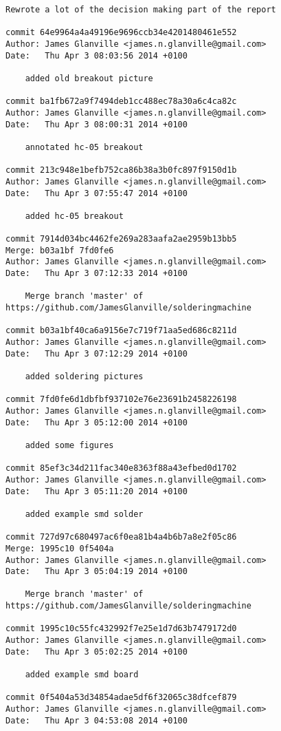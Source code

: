 \documentclass[a4paper,11pt]{article}  %
\begin{document}
\begin{lstlisting}[frame=single]
    Rewrote a lot of the decision making part of the report

commit 64e9964a4a49196e9696ccb34e4201480461e552
Author: James Glanville <james.n.glanville@gmail.com>
Date:   Thu Apr 3 08:03:56 2014 +0100

    added old breakout picture

commit ba1fb672a9f7494deb1cc488ec78a30a6c4ca82c
Author: James Glanville <james.n.glanville@gmail.com>
Date:   Thu Apr 3 08:00:31 2014 +0100

    annotated hc-05 breakout

commit 213c948e1befb752ca86b38a3b0fc897f9150d1b
Author: James Glanville <james.n.glanville@gmail.com>
Date:   Thu Apr 3 07:55:47 2014 +0100

    added hc-05 breakout

commit 7914d034bc4462fe269a283aafa2ae2959b13bb5
Merge: b03a1bf 7fd0fe6
Author: James Glanville <james.n.glanville@gmail.com>
Date:   Thu Apr 3 07:12:33 2014 +0100

    Merge branch 'master' of https://github.com/JamesGlanville/solderingmachine

commit b03a1bf40ca6a9156e7c719f71aa5ed686c8211d
Author: James Glanville <james.n.glanville@gmail.com>
Date:   Thu Apr 3 07:12:29 2014 +0100

    added soldering pictures

commit 7fd0fe6d1dbfbf937102e76e23691b2458226198
Author: James Glanville <james.n.glanville@gmail.com>
Date:   Thu Apr 3 05:12:00 2014 +0100

    added some figures

commit 85ef3c34d211fac340e8363f88a43efbed0d1702
Author: James Glanville <james.n.glanville@gmail.com>
Date:   Thu Apr 3 05:11:20 2014 +0100

    added example smd solder

commit 727d97c680497ac6f0ea81b4a4b6b7a8e2f05c86
Merge: 1995c10 0f5404a
Author: James Glanville <james.n.glanville@gmail.com>
Date:   Thu Apr 3 05:04:19 2014 +0100

    Merge branch 'master' of https://github.com/JamesGlanville/solderingmachine

commit 1995c10c55fc432992f7e25e1d7d63b7479172d0
Author: James Glanville <james.n.glanville@gmail.com>
Date:   Thu Apr 3 05:02:25 2014 +0100

    added example smd board

commit 0f5404a53d34854adae5df6f32065c38dfcef879
Author: James Glanville <james.n.glanville@gmail.com>
Date:   Thu Apr 3 04:53:08 2014 +0100


\end{lstlisting}
\end{document}
